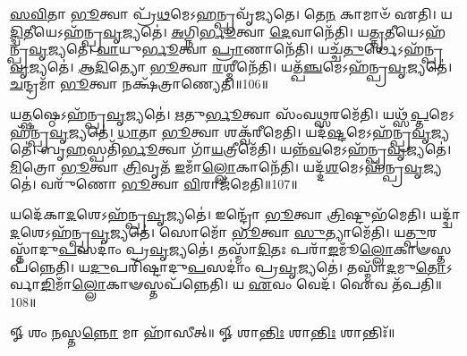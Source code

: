 \-\ul{𑌸}\-\-\ul{𑌵𑌿}\-𑌤𑌾 \ul{𑌭𑍂}\-𑌤𑍍𑌵𑌾 𑌪𑍍𑌰᳴\-\ul{𑌥}\-𑌮𑍇𑌽\-\ul{𑌹}\-𑌨𑍍𑌪𑍍𑌰𑌵𑍃᳴𑌜𑍍𑌯𑌤𑍇। 
𑌤𑍇\-\ul{𑌨} 𑌕𑌾𑌮𑌾𑍞᳴ 𑌏𑌤𑌿। 
𑌯\-\ul{𑌦𑍍𑌦𑍍𑌵𑌿}\-𑌤𑍀𑌯𑍇𑌽𑌹᳴𑌨𑍍𑌪𑍍𑌰\-\ul{𑌵𑍃}\-𑌜𑍍𑌯𑌤𑍇॑। 
\-\ul{𑌅}\-𑌗𑍍𑌨𑌿\-\ul{𑌰𑍍𑌭𑍂}\-𑌤𑍍𑌵𑌾 \ul{𑌦𑍇}\-𑌵𑌾𑌨𑍇᳴𑌤𑌿। 
𑌯\-\ul{𑌤𑍍𑌤𑍃}\-𑌤𑍀𑌯𑍇𑌽𑌹᳴𑌨𑍍𑌪𑍍𑌰\-\-\ul{𑌵𑍃}\-𑌜𑍍𑌯𑌤𑍇॑। 
\-\ul{𑌵𑌾}\-𑌯𑍁\-\ul{𑌰𑍍𑌭𑍂}\-𑌤𑍍𑌵𑌾 \ul{𑌪𑍍𑌰𑌾}\-𑌣𑌾𑌨𑍇᳴𑌤𑌿। 
𑌯𑌚𑍍𑌚᳴\-\ul{𑌤𑍁}\-𑌰𑍍𑌥𑍇𑌽𑌹᳴𑌨𑍍𑌪𑍍𑌰\-\ul{𑌵𑍃}\-𑌜𑍍𑌯𑌤𑍇॑। 
\-\ul{𑌆}\-\-\ul{𑌦𑌿}\-𑌤𑍍𑌯𑍋 \ul{𑌭𑍂}\-𑌤𑍍𑌵𑌾 \ul{𑌰}\-𑌶𑍍𑌮𑍀𑌨𑍇᳴𑌤𑌿। 
𑌯𑌤𑍍𑌪᳴\-\ul{𑌞𑍍𑌚}\-𑌮𑍇𑌽𑌹᳴𑌨𑍍𑌪𑍍𑌰\-\ul{𑌵𑍃}\-𑌜𑍍𑌯𑌤𑍇॑। 
\-\ul{𑌚}\-𑌨𑍍𑌦𑍍𑌰𑌮𑌾᳴ \ul{𑌭𑍂}\-𑌤𑍍𑌵𑌾 𑌨𑌕𑍍𑌷᳴𑌤𑍍𑌰𑌾𑌣𑍍𑌯𑍇𑌤𑌿॥106॥

𑌯\-\ul{𑌤𑍍𑌷}\-𑌷𑍍𑌠𑍇𑌽𑌹᳴𑌨𑍍𑌪𑍍𑌰\-\ul{𑌵𑍃}\-𑌜𑍍𑌯𑌤𑍇॑। 
\-\ul{𑌋}\-𑌤𑍁\-\ul{𑌰𑍍𑌭𑍂}\-𑌤𑍍𑌵𑌾 𑌸𑌂᳴𑌵\-\ul{𑌥𑍍𑌸}\-𑌰𑌮𑍇᳴𑌤𑌿। 
𑌯𑌥𑍍𑌸᳴\-\ul{𑌪𑍍𑌤}\-𑌮𑍇𑌽𑌹᳴𑌨𑍍𑌪𑍍𑌰\-\-\ul{𑌵𑍃}\-𑌜𑍍𑌯𑌤𑍇॑। 
\-\ul{𑌧𑌾}\-𑌤𑌾 \ul{𑌭𑍂}\-𑌤𑍍𑌵𑌾 𑌶𑌕𑍍𑌵᳴𑌰𑍀𑌮𑍇𑌤𑌿। 
𑌯𑌦᳴\-\ul{𑌷𑍍𑌟}\-𑌮𑍇𑌽𑌹᳴𑌨𑍍𑌪𑍍𑌰\-\ul{𑌵𑍃}\-𑌜𑍍𑌯𑌤𑍇॑। 
𑌬𑍃\-\ul{𑌹}\-𑌸𑍍𑌪𑌤𑌿᳴\-\ul{𑌰𑍍𑌭𑍂}\-𑌤𑍍𑌵𑌾 𑌗𑌾᳴\-\ul{𑌯}\-𑌤𑍍𑌰𑍀𑌮𑍇᳴𑌤𑌿। 
𑌯𑌨𑍍𑌨᳴\-\ul{𑌵}\-𑌮𑍇𑌽𑌹᳴𑌨𑍍𑌪𑍍𑌰\-\ul{𑌵𑍃}\-𑌜𑍍𑌯𑌤𑍇॑। 
\-\ul{𑌮𑌿}\-𑌤𑍍𑌰𑍋 \ul{𑌭𑍂}\-𑌤𑍍𑌵𑌾 \ul{𑌤𑍍𑌰𑌿}\-𑌵𑍃𑌤᳴ \ul{𑌇}\-𑌮𑌾𑌁\-\ul{𑌲𑍍𑌲𑍋}\-𑌕𑌾𑌨𑍇᳴𑌤𑌿। 
𑌯𑌦𑍍𑌦᳴\-\ul{𑌶}\-𑌮𑍇𑌽𑌹᳴𑌨𑍍𑌪𑍍𑌰\-\ul{𑌵𑍃}\-𑌜𑍍𑌯𑌤𑍇॑। 
𑌵𑌰𑍁᳴𑌣𑍋 \ul{𑌭𑍂}\-𑌤𑍍𑌵𑌾 \ul{𑌵𑌿}\-𑌰𑌾𑌜᳴𑌮𑍇𑌤𑌿॥107॥

𑌯𑌦𑍇᳴𑌕𑌾\-\ul{𑌦}\-𑌶𑍇𑌽𑌹᳴𑌨𑍍𑌪𑍍𑌰\-\ul{𑌵𑍃}\-𑌜𑍍𑌯𑌤𑍇॑। 
𑌇𑌨𑍍𑌦𑍍𑌰𑍋᳴ \ul{𑌭𑍂}\-𑌤𑍍𑌵𑌾 \ul{𑌤𑍍𑌰𑌿}\-𑌷𑍍𑌟𑍁𑌭᳴𑌮𑍇𑌤𑌿। 
𑌯𑌦𑍍𑌦𑍍𑌵𑌾᳴\-\ul{𑌦}\-𑌶𑍇𑌽𑌹᳴𑌨𑍍𑌪𑍍𑌰\-\-\ul{𑌵𑍃}\-𑌜𑍍𑌯𑌤𑍇॑। 
𑌸𑍋𑌮𑍋᳴ \ul{𑌭𑍂}\-𑌤𑍍𑌵𑌾 \ul{𑌸𑍁}\-𑌤𑍍𑌯𑌾𑌮𑍇᳴𑌤𑌿। 
𑌯\-\ul{𑌤𑍍𑌪𑍁}\-𑌰𑌸𑍍𑌤𑌾᳴𑌦𑍁\-\ul{𑌪}\-𑌸𑌦𑌾𑌂॑ 𑌪𑍍𑌰\-\ul{𑌵𑍃}\-𑌜𑍍𑌯𑌤𑍇॑। 
𑌤𑌸𑍍𑌮𑌾᳴\-\ul{𑌦𑌿}\-𑌤𑌃 𑌪𑌰𑌾᳴\-\ul{𑌙}\-𑌮𑍂𑌁\-\ul{𑌲𑍍𑌲𑍋}\-𑌕𑌾𑍟\-𑌸𑍍𑌤𑌪᳴𑌨𑍍𑌨𑍇𑌤𑌿। 
𑌯\-\ul{𑌦𑍁}\-𑌪𑌰𑌿᳴𑌷𑍍𑌟𑌾𑌦𑍁\-\ul{𑌪}\-𑌸𑌦𑌾𑌂॑ 𑌪𑍍𑌰\-\ul{𑌵𑍃}\-𑌜𑍍𑌯𑌤𑍇॑। 
𑌤𑌸𑍍𑌮𑌾᳴\-\ul{𑌦}\-𑌮𑍁\-\ul{𑌤𑍋}\-𑌽𑌰𑍍𑌵𑌾\-\-\ul{𑌙𑌿}\-𑌮𑌾𑌁\-\ul{𑌲𑍍𑌲𑍋}\-𑌕𑌾𑍟\-𑌸𑍍𑌤𑌪᳴𑌨𑍍𑌨𑍇𑌤𑌿। 
𑌯 \ul{𑌏}\-𑌵𑌂 𑌵𑍇𑌦᳴। 
𑌐𑌵 𑌤᳴𑌪𑌤𑌿॥108॥
\anuvakamend[𑌨𑌕𑍍𑌷᳴𑌤𑍍𑌰𑌾𑌣𑍍𑌯𑍇𑌤𑌿 \ul{𑌵𑌿}\-𑌰𑌾𑌜᳴𑌮𑍇𑌤𑌿 𑌤𑌪𑌤𑌿]

𑍐 𑌶𑌂 \ul{𑌨}\-𑌸𑍍𑌤\-\ul{𑌨𑍍𑌨𑍋} 𑌮𑌾 𑌹𑌾᳴𑌸𑍀𑌤𑍍॥ 𑍐 𑌶𑌾\-\ul{𑌨𑍍𑌤𑌿𑌃} 𑌶𑌾\-\ul{𑌨𑍍𑌤𑌿𑌃} 𑌶𑌾𑌨𑍍𑌤𑌿𑌃᳴॥

\closesection
